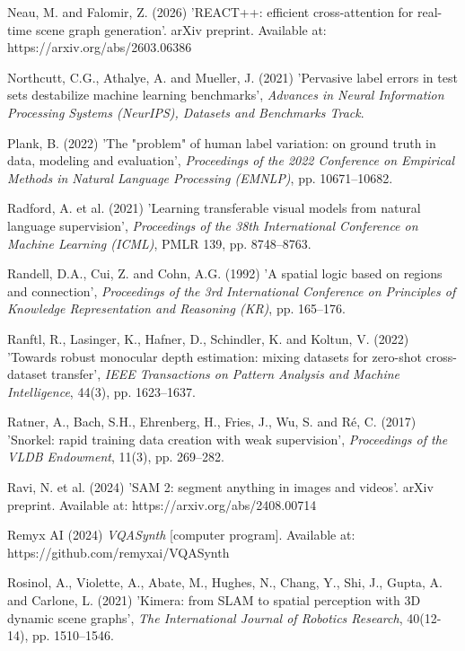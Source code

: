 \begin{description}[leftmargin=2em, labelindent=0em, itemsep=0.1em, parsep=0pt, topsep=0.3em]
\item[] Neau, M. and Falomir, Z. (2026) 'REACT++: efficient cross-attention for real-time scene graph generation'. arXiv preprint. Available at: https:/\allowbreak{}/\allowbreak{}arxiv.\allowbreak{}org/\allowbreak{}abs/\allowbreak{}2603.\allowbreak{}06386
\item[] Northcutt, C.G., Athalye, A. and Mueller, J. (2021) 'Pervasive label errors in test sets destabilize machine learning benchmarks', \textit{Advances in Neural Information Processing Systems (NeurIPS), Datasets and Benchmarks Track}.
\item[] Plank, B. (2022) 'The "problem" of human label variation: on ground truth in data, modeling and evaluation', \textit{Proceedings of the 2022 Conference on Empirical Methods in Natural Language Processing (EMNLP)}, pp. 10671--10682.
\item[] Radford, A. et al. (2021) 'Learning transferable visual models from natural language supervision', \textit{Proceedings of the 38th International Conference on Machine Learning (ICML)}, PMLR 139, pp. 8748--8763.
\item[] Randell, D.A., Cui, Z. and Cohn, A.G. (1992) 'A spatial logic based on regions and connection', \textit{Proceedings of the 3rd International Conference on Principles of Knowledge Representation and Reasoning (KR)}, pp. 165--176.
\item[] Ranftl, R., Lasinger, K., Hafner, D., Schindler, K. and Koltun, V. (2022) 'Towards robust monocular depth estimation: mixing datasets for zero-shot cross-dataset transfer', \textit{IEEE Transactions on Pattern Analysis and Machine Intelligence}, 44(3), pp. 1623--1637.
\item[] Ratner, A., Bach, S.H., Ehrenberg, H., Fries, J., Wu, S. and Ré, C. (2017) 'Snorkel: rapid training data creation with weak supervision', \textit{Proceedings of the VLDB Endowment}, 11(3), pp. 269--282.
\item[] Ravi, N. et al. (2024) 'SAM 2: segment anything in images and videos'. arXiv preprint. Available at: https:/\allowbreak{}/\allowbreak{}arxiv.\allowbreak{}org/\allowbreak{}abs/\allowbreak{}2408.\allowbreak{}00714
\item[] Remyx AI (2024) \textit{VQASynth} [computer program]. Available at: https:/\allowbreak{}/\allowbreak{}github.\allowbreak{}com/\allowbreak{}remyxai/\allowbreak{}VQASynth
\item[] Rosinol, A., Violette, A., Abate, M., Hughes, N., Chang, Y., Shi, J., Gupta, A. and Carlone, L. (2021) 'Kimera: from SLAM to spatial perception with 3D dynamic scene graphs', \textit{The International Journal of Robotics Research}, 40(12-14), pp. 1510--1546.

\end{description}

